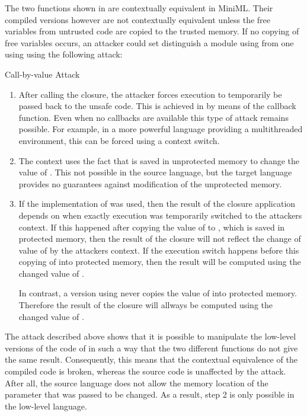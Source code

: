 The two functions shown in  are contextually equivalent in \mbox{MiniML}.
Their compiled versions however are not contextually equivalent unless the free variables from untrusted code are copied to the trusted memory.
If no copying of free variables occurs, an attacker could set distinguish a module using  from one using  using the following attack:


\begin{attack}{Call-by-value Attack}
\begin{enumerate}
\item After calling the closure, the attacker forces execution to temporarily be passed back to the unsafe code.
This is achieved in  by means of the callback function. 
Even when no callbacks are available this type of attack remains possible. For example, in a more powerful language providing a multithreaded environment, this can be forced using a context switch.
\item The context uses the fact that  is saved in unprotected memory to change the value of . This not possible in the source language, but the target language provides no guarantees against modification of the unprotected memory.
\item If the implementation of  was used, then the result of the closure application depends on when exactly execution was temporarily switched to the attackers context.
If this happened after copying the value of  to , which is saved in protected memory, then the result of the closure will not reflect the change of value of  by the attackers context.
If the execution switch happens before this copying of  into protected memory, then the result will be computed using the changed value of .

In contrast, a version using   never copies the value of  into protected memory. 
Therefore the result of the closure will allways be computed using the changed value of .
\end{enumerate}
\end{attack}


The attack described above shows that it is possible to manipulate the low-level versions of the code of  in such a way that the two different functions do not give the same result. 
Consequently, this means that the contextual equivalence of the compiled code is broken, whereas the source code is unaffected by the attack.
After all, the source language does not allow the memory location of the parameter that was passed to be changed. As a result, step 2 is only possible in the low-level language.

